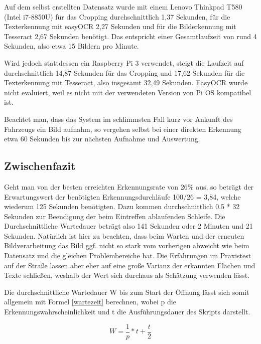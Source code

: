 Auf dem selbst erstellten Datensatz wurde mit einem Lenovo Thinkpad T580 (Intel i7-8850U) für das Cropping durchschnittlich 1,37 Sekunden,
für die Texterkennung mit easyOCR 2,27 Sekunden und für die Bilderkennung mit Tesseract 2,67 Sekunden benötigt.
Das entspricht einer Gesamtlaufzeit von rund 4 Sekunden, also etwa 15 Bildern pro Minute.

Wird jedoch stattdessen ein Raspberry Pi 3 verwendet, steigt die Laufzeit auf durchschnittlich 14,87 Sekunden für das Cropping und 17,62 Sekunden für die Texterkennung mit Tesseract, also insgesamt 32,49 Sekunden.
EasyOCR wurde nicht evaluiert, weil es nicht mit der verwendeten Version von Pi OS kompatibel ist.

Beachtet man, dass das System im schlimmsten Fall kurz vor Ankunft des Fahrzeugs ein Bild aufnahm, so vergehen selbst bei einer direkten Erkennung etwa 60 Sekunden bis zur nächsten Aufnahme und Auswertung. 

\subsection{Zwischenfazit}
Geht man von der besten erreichten Erkennungsrate von 26\% aus, so beträgt der Erwartungswert der benötigten Erkennungsdurchläufe 100/26 = 3,84, welche wiederum 125 Sekunden benötigten. Dazu kommen durchschnittlich 0.5 * 32 Sekunden zur Beendigung der beim Eintreffen ablaufenden Schleife. Die Durchschnittliche Wartedauer beträgt also 141 Sekunden oder 2 Minuten und 21 Sekunden. 
\newline Natürlich ist hier zu beachten, dass beim Warten und der erneuten Bildverarbeitung das Bild ggf. nicht so stark vom vorherigen abweicht wie beim Datensatz und die gleichen Problembereiche hat. Die Erfahrungen im Praxistest auf der Straße lassen aber eher auf eine große Varianz der erkannten Flächen und Texte schließen, weshalb der Wert sich durchaus als Schätzung verwenden lässt.

Die durchschnittliche Wartedauer W bis zum Start der Öffnung lässt sich somit allgemein mit  Formel \ref{wartezeit} berechnen, wobei p die Erkennungswahrscheinlichkeit und t die Ausführungsdauer des Skripts darstellt.

\begin{equation}
	W=\frac{1}{p} * t + \frac{t}{2}
\label{wartezeit}
\end{equation}
